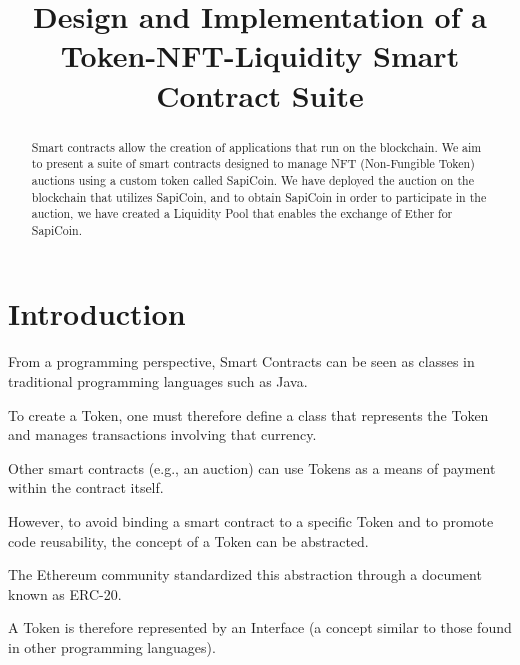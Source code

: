 \documentclass[conference]{IEEEtran}
\begin{document}
\title{Design and Implementation of a Token-NFT-Liquidity Smart Contract Suite\\
}

\author{
\and
{}
}

\maketitle

\begin{abstract}
Smart contracts allow the creation of applications that run on the blockchain.
We aim to present a suite of smart contracts designed to manage NFT (Non-Fungible Token) auctions using a custom token called SapiCoin.
We have deployed the auction on the blockchain
that utilizes SapiCoin, and to obtain SapiCoin in order 
to participate in the auction, 
we have created a Liquidity Pool that enables the exchange of Ether for SapiCoin.
\end{abstract}

\section{Introduction}

From a programming perspective, Smart Contracts can be seen as classes in traditional programming languages such as Java.

To create a Token, one must therefore define a class that represents the Token and manages transactions involving that currency.

Other smart contracts (e.g., an auction) can use Tokens as a means of payment within the contract itself.

However, to avoid binding a smart contract to a specific Token and to promote code reusability, the concept of a Token can be abstracted.

The Ethereum community standardized this abstraction through a document known as ERC-20. \cite{erc20}

A Token is therefore represented by an Interface (a concept similar to those found in other programming languages).
\end{document}
